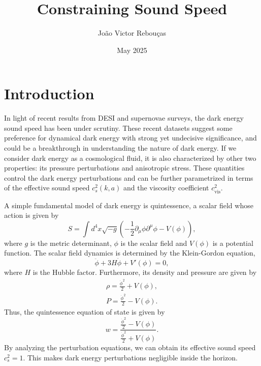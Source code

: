 \documentclass{article}
\title{Constraining Sound Speed}
\author{João Victor Rebouças}
\date{May 2025}
\begin{document}
\maketitle


\section{Introduction}
In light of recent results from DESI and supernovae surveys, the dark energy sound speed has been under scrutiny. These recent datasets suggest some preference for dynamical dark energy with strong yet undecisive significance, and could be a breakthrough in understanding the nature of dark energy. If we consider dark energy as a cosmological fluid, it is also characterized by other two properties: its pressure perturbations and anisotropic stress. These quantities control the dark energy perturbations and can be further parametrized in terms of the effective sound speed $c_s^2(k, a)$ and the viscosity coefficient $c_\mathrm{vis}^2$.

A simple fundamental model of dark energy is quintessence, a scalar field whose action is given by
\begin{equation}
    S = \int d^4x \sqrt{-g}\left( -\frac{1}{2}\partial_\mu\phi\partial^\mu\phi - V(\phi) \right),
\end{equation}
where $g$ is the metric determinant, $\phi$ is the scalar field and $V(\phi)$ is a potential function. The scalar field dynamics is determined by the Klein-Gordon equation,
\begin{equation}
    \ddot\phi + 3H\dot\phi + V'(\phi) = 0,
\end{equation}
where $H$ is the Hubble factor. Furthermore, its density and pressure are given by
\begin{align}
    \rho = \frac{\dot\phi^2}{2} + V(\phi), \\
    P = \frac{\dot\phi^2}{2} - V(\phi).
\end{align}
Thus, the quintessence equation of state is given by
\begin{equation}
    w = \frac{\frac{\dot\phi^2}{2} - V(\phi)}{\frac{\dot\phi^2}{2} + V(\phi)}.
\end{equation}
By analyzing the perturbation equations, we can obtain its effective sound speed $c_s^2 = 1$. This makes dark energy perturbations negligible inside the horizon.
\end{document}
